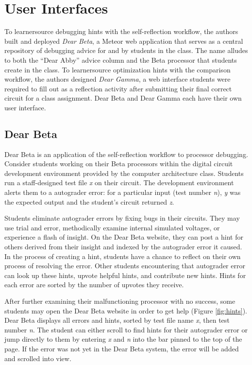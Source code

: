 \section{User Interfaces} 
To learnersource debugging hints with the self-reflection workflow, the authors built and deployed {\it Dear Beta}, a Meteor web application that serves as a central repository of debugging advice for and by students in the class. The name alludes to both the ``Dear Abby'' advice column and the Beta processor that students create in the class. To learnersource optimization hints with the comparison workflow, the authors designed {\it Dear Gamma}, a web interface students were required to fill out as a reflection activity after submitting their final correct circuit for a class assignment.
Dear Beta and Dear Gamma each have their own user interface.

\subsection{Dear Beta}

Dear Beta is an application of the self-reflection workflow to processor debugging. Consider students working on their Beta processors within the digital circuit development environment provided by the computer architecture class. Students run a staff-designed test file {\it x} on their circuit. The development environment alerts them to a autograder error: for a particular input (test number {\it n}), {\it y} was the expected output and the student's circuit returned {\it z}. 

Students eliminate autograder errors by fixing bugs in their circuits. They may use trial and error, methodically examine internal simulated voltages, or experience a flash of insight. On the Dear Beta website, they can post a hint for others derived from their insight and indexed by the autograder error it caused. In the process of creating a hint, students have a chance to reflect on their own process of resolving the error.  Other students encountering that autograder error can look up these hints, upvote helpful hints, and contribute new hints. Hints for each error are sorted by the number of upvotes they receive.

After further examining their malfunctioning processor with no success, some students may open the Dear Beta website in order to get help (Figure \ref{fig:hints}). Dear Beta displays all errors and hints, sorted by test file name {\it x}, then test number {\it n}. The student can either scroll to find hints for their autograder error or jump directly to them by entering {\it x} and {\it n} into the bar pinned to the top of the page. If the error was not yet in the Dear Beta system, the error will be added and scrolled into view. 

